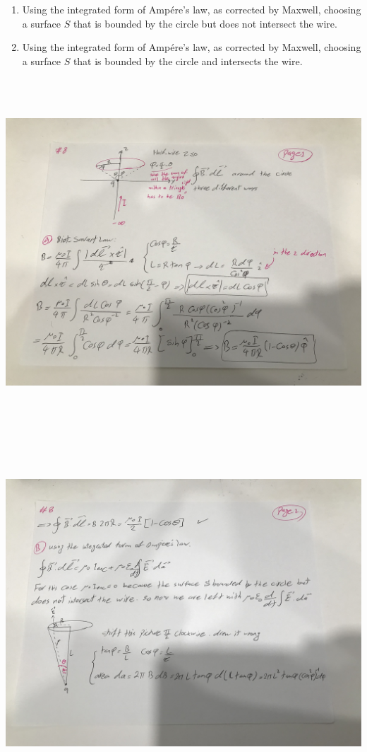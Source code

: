 \documentclass[fleqn]{article}
\begin{document}
\begin{enumerate}
\begin{enumerate}
      \item Using the integrated form of Ampére’s law, as corrected by Maxwell, choosing a surface $S$ that is 
      bounded by the circle but does not intersect the wire.

      \item Using the integrated form of Ampére’s law, as corrected by Maxwell, choosing a surface $S$ that is 
      bounded by the circle and intersects the wire.
    \end{enumerate}

    \includegraphics[height=13cm, width=15cm]{8A.jpg}

    \pagebreak

    \includegraphics[height=13cm, width=15cm]{8B.jpg}


\end{enumerate}
\end{document}
